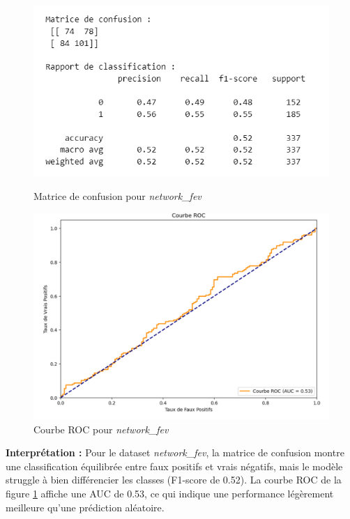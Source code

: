 \begin{figure}[H]
    \centering
    \begin{minipage}{0.45\linewidth}
        \centering
        \includegraphics[width=\linewidth]{capture_modele_1.png}
        \caption{Matrice de confusion pour \textit{network\_fev}}
        \label{eee}
    \end{minipage}
    \hfill
    \begin{minipage}{0.45\linewidth}
        \centering
        \includegraphics[width=\linewidth]{capture_modele_3.png}
        \caption{Courbe ROC pour \textit{network\_fev}}
        \label{hhh}
    \end{minipage}
\end{figure}

\textbf{Interprétation :} Pour le dataset \textit{network\_fev}, la matrice de confusion montre une classification équilibrée entre faux positifs et vrais négatifs, mais le modèle struggle à bien différencier les classes (F1-score de 0.52). La courbe ROC de la figure \ref{hhh} affiche une AUC de 0.53, ce qui indique une performance légèrement meilleure qu'une prédiction aléatoire.

